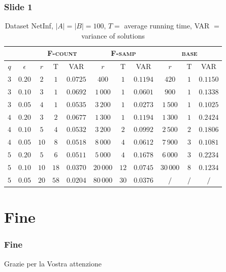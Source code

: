 \documentclass[11pt,svgnames,smaller]{beamer}
\newcommand{\fsamp}{\textsc{F-samp}\xspace}
\newcommand{\base}{\textsc{base}\xspace}
\newcommand{\fcount}{\textsc{F-count}\xspace}
\begin{document}
	\begin{frame}
		
		\frametitle{Slide 1}
		
		\begin{table}[ht]
			\centering
			\begin{tabular}{|c|c|c|c|c|c|c|c|c|c|c|}
				\cline{3-11}
				\multicolumn{2}{c|}{} & \multicolumn{3}{c|}{\fcount} & \multicolumn{3}{c|}{\fsamp} & \multicolumn{3}{c|}{\base}\\
				\hline	
				$q$ & $\epsilon$ & $r$ & T    & VAR      & $r$ & T    & VAR      & $r$ & T   & VAR      \\ \hline
				$3$ & $0.20$     & $2$  & $1$  & $0.0725$ & $400$     & $1$  & $0.1194$ & $420$     & $1$ & $0.1150$ \\ \hline
				$3$ & $0.10$     & $3$  & $1$  & $0.0692$ & $1\,000$  & $1$  & $0.0601$ & $900$     & $1$ & $0.1338$ \\ \hline
				$3$ & $0.05$     & $4$  & $1$  & $0.0535$ & $3\,200$  & $1$  & $0.0273$ & $1\,500$  & $1$ & $0.1025$ \\ \hline
				\hline
				$4$ & $0.20$     & $3$  & $2$  & $0.0677$ & $1\,300$  & $1$  & $0.1194$ & $1\,300$  & $1$ & $0.2424$ \\ \hline
				$4$ & $0.10$     & $5$  & $4$  & $0.0532$ & $3\,200$  & $2$  & $0.0992$ & $2\,500$  & $2$ & $0.1806$ \\ \hline
				$4$ & $0.05$     & $10$ & $8$  & $0.0518$ & $8\,000$  & $4$  & $0.0612$ & $7\,900$  & $3$ & $0.1081$ \\ \hline
				\hline
				$5$ & $0.20$     & $5$  & $6$  & $0.0511$ & $5\,000$  & $4$  & $0.1678$ & $6\,000$  & $3$ & $0.2234$ \\ \hline
				$5$ & $0.10$     & $10$ & $18$ & $0.0370$ & $20\,000$ & $12$ & $0.0745$ & $30\,000$ & $8$ & $0.1234$ \\ \hline
				$5$ & $0.05$     & $20$ & $58$ & $0.0204$ & $80\,000$ & $30$ & $0.0376$ & $/$       & $/$ & $/$      \\ \hline
			\end{tabular}
			\caption{ Dataset NetInf, $|A| = |B| = 100$, $T = $ average running time, VAR $ = $ variance of solutions}
		\end{table}
	
	\end{frame}

	
	\section{Fine}
	
	\begin{frame}
		
		\frametitle{Fine}
		\centering
		\Large
		Grazie per la Vostra attenzione
			
 	\end{frame}
\end{document}
